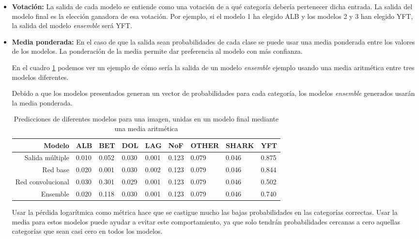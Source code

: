 \begin{itemize}
    \item{\textbf{Votación:} La salida de cada modelo se entiende como una
            votación de a qué categoría debería pertenecer dicha entrada. La
            salida del modelo final es la elección ganadora de esa votación. Por
            ejemplo, si el modelo 1 ha elegido ALB y los modelos 2 y 3 han
        elegido YFT, la salida del modelo \textit{ensemble} será YFT.}
    \item{\textbf{Media ponderada:} En el caso de que la salida sean
            probabilidades de cada clase se puede  usar una media ponderada
            entre los valores de los modelos. La ponderación de la media permite
            dar preferencia al modelo con más confianza.
            
            En el cuadro \ref{ensemble_sample} podemos ver un ejemplo de cómo
        sería la salida de un modelo \textit{ensemble} ejemplo usando una media
    aritmética entre tres modelos diferentes.}

Debido a que los modelos presentados generan un vector de probabilidades para
cada categoría, los modelos \textit{ensemble} generados usarán la media
ponderada.

\begin{table}[]
\centering
\caption{Predicciones de diferentes modelos para una imagen, unidas en un modelo
final mediante una media aritmética}
\label{ensemble_sample}
\begin{tabular}{rllllllll}
Modelo              & ALB   & BET   & DOL   & LAG   & NoF   & OTHER & SHARK  & YFT  \\
\hline
Salida múltiple     & 0.010 & 0.052 & 0.030 & 0.001 & 0.123 & 0.079 & 0.046 & 0.875\\
Red base            & 0.020 & 0.001 & 0.030 & 0.002 & 0.123 & 0.079 & 0.046 & 0.844\\
Red convolucional   & 0.030 & 0.301 & 0.029 & 0.001 & 0.123 & 0.079 & 0.046 & 0.502\\
\hline
Ensemble            & 0.020 & 0.118 & 0.030 & 0.001 & 0.123 & 0.079 & 0.046 & 0.740
\end{tabular}
\end{table}

Usar la pérdida logarítmica como métrica hace que se castigue mucho las bajas
probabilidades en las categorías correctas. Usar la media para estos modelos
puede ayudar a evitar este comportamiento, ya que solo tendrán probabilidades
cercanas a cero aquellas categorías que sean casi cero en todos los modelos.


\end{itemize}
